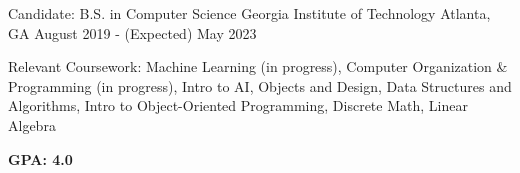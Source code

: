 


\begin{cventries}

\cventry
{Candidate: B.S. in Computer Science}
{Georgia Institute of Technology}
{Atlanta, GA}
{August 2019 - (Expected) May 2023}
{\begin{cvitems}
\item {Relevant Coursework: Machine Learning (in progress), Computer Organization \& Programming (in progress), Intro to AI, Objects and Design, Data Structures and Algorithms, Intro to Object-Oriented Programming, Discrete Math, Linear Algebra}
\item \textbf{GPA: 4.0}
\end{cvitems}
}


\end{cventries}
